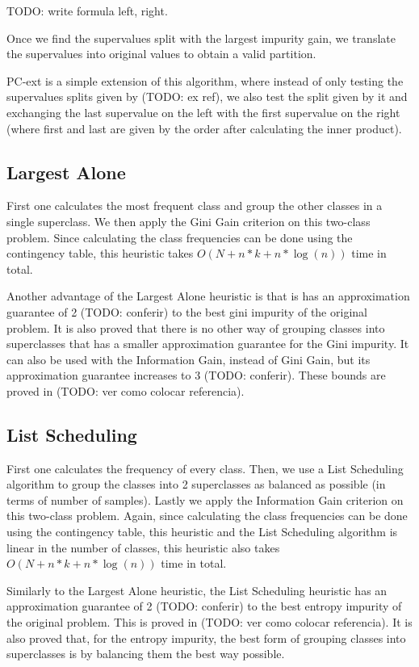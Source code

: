 TODO: write formula left, right.

Once we find the supervalues split with the largest impurity gain, we translate the supervalues into original values to obtain a valid partition.

PC-ext is a simple extension of this algorithm, where instead of only testing the supervalues splits given by (TODO: ex ref), we also test the split given by it and exchanging the last supervalue on the left with the first supervalue on the right (where first and last are given by the order after calculating the inner product).

\subsection{Largest Alone}
First one calculates the most frequent class and group the other classes in a single superclass. We then apply the Gini Gain criterion on this two-class problem. Since calculating the class frequencies can be done using the contingency table, this heuristic takes $O(N + n*k + n * \log(n))$ time in total.

Another advantage of the Largest Alone heuristic is that is has an approximation guarantee of 2 (TODO: conferir) to the best gini impurity of the original problem. It is also proved that there is no other way of grouping classes into superclasses that has a smaller approximation guarantee for the Gini impurity. It can also be used with the Information Gain, instead of Gini Gain, but its approximation guarantee increases to 3 (TODO: conferir). These bounds are proved in (TODO: ver como colocar referencia).

\subsection{List Scheduling}
First one calculates the frequency of every class. Then, we use a List Scheduling algorithm to group the classes into 2 superclasses as balanced as possible (in terms of number of samples). Lastly we apply the Information Gain criterion on this two-class problem. Again, since calculating the class frequencies can be done using the contingency table, this heuristic and the List Scheduling algorithm is linear in the number of classes, this heuristic also takes $O(N + n*k + n * \log(n))$ time in total.

Similarly to the Largest Alone heuristic, the List Scheduling heuristic has an approximation guarantee of 2 (TODO: conferir) to the best entropy impurity of the original problem. This is proved in (TODO: ver como colocar referencia). It is also proved that, for the entropy impurity, the best form of grouping classes into superclasses is by balancing them the best way possible.
